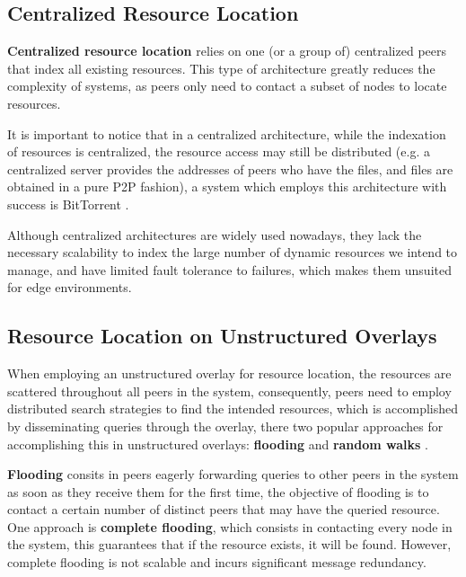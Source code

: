 \subsection{Centralized Resource Location}

\textbf{Centralized resource location} relies on one (or a group of) centralized peers that index all existing resources. This type of architecture greatly reduces the complexity of systems, as peers only need to contact a subset of nodes to locate resources. 

It is important to notice that in a centralized architecture, while the indexation of resources is centralized, the resource access may still be distributed (e.g. a centralized server provides the addresses of peers who have the files, and files are obtained in a pure P2P fashion), a system which employs this architecture with success is BitTorrent \cite{cohen2003incentives}.

Although centralized architectures are widely used nowadays, they lack the necessary scalability to index the large number of dynamic resources we intend to manage, and have limited fault tolerance to failures, which makes them unsuited for edge environments. 


\subsection{Resource Location on Unstructured Overlays}

When employing an unstructured overlay for resource location, the resources are scattered throughout all peers in the system, consequently, peers need to employ distributed search strategies to find the intended resources, which is accomplished by disseminating queries through the overlay, there two popular approaches for accomplishing this in unstructured overlays: \textbf{flooding} and \textbf{random walks} \cite{leitaoPHDthesis}. 

\textbf{Flooding} consits in peers eagerly forwarding queries to other peers in the system as soon as they receive them for the first time, the objective of flooding is to contact a certain number of distinct peers that may have the queried resource. One approach is \textbf{complete flooding}, which consists in contacting every node in the system, this guarantees that if the resource exists, it will be found. However, complete flooding is not scalable and incurs significant message redundancy. 

